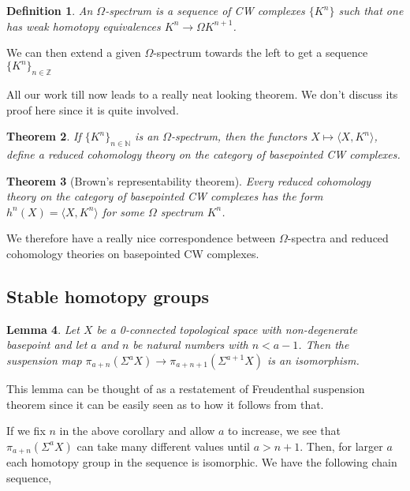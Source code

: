 \documentclass[12pt]{extarticle}
\numberwithin{equation}{section}
\newtheorem{thm}{Theorem}[section]
\newtheorem{lem}[thm]{Lemma}
\newtheorem{defn}[thm]{Definition}
\newcommand{\Z}{\mathbb{Z}}
\newcommand{\N}{\mathbb{N}}
\begin{document}
\begin{defn}
An $\Omega$-spectrum is a sequence of CW complexes $\{K^n\}$ such that one has weak homotopy equivalences $K^n\to \Omega K^{n+1}$.
\end{defn}

We can then extend a given $\Omega$-spectrum towards the left to get a sequence $\{K^n\}_{n\in\Z}$

All our work till now leads to a really neat looking theorem. We don't discuss its proof here since it is quite involved.\\

\begin{thm}\cite[p.~397]{Hatcher}
If $\{K^n\}_{n\in \N}$ is an $\Omega$-spectrum, then the functors $X\mapsto \langle X, K^n\rangle$, define a reduced cohomology theory on the category of basepointed CW complexes.
\end{thm}

\begin{thm}[Brown's representability theorem]\cite[p.~448]{Hatcher}
Every reduced cohomology theory on the category of basepointed CW complexes has the form $h^n(X) = \langle X,K^n\rangle$ for some $\Omega$ spectrum ${K^n}$.
\end{thm}

We therefore have a really nice correspondence between $\Omega$-spectra and reduced cohomology theories on basepointed CW complexes.


\subsection{Stable homotopy groups}

\begin{lem}\cite[p.~7--9]{barnes_roitzheim_2020}
Let $X$ be a 0-connected topological space with non-degenerate basepoint and let $a$ and $n$ be natural numbers with $n < a - 1$. Then the suspension map $\pi_{a+n}(\Sigma^a X) \to \pi_{a+n+1}(\Sigma^{a+1}X)$ is an isomorphism.
\end{lem}

This lemma can be thought of as a restatement of Freudenthal suspension theorem since it can be easily seen as to how it follows from that.

If we fix $n$ in the above corollary and allow $a$ to increase, we see that $\pi_{a+n}(\Sigma^aX)$ can take many different values until $a > n + 1$. Then, for larger $a$ each homotopy group in the sequence is isomorphic. We have the following chain sequence,
\end{document}
